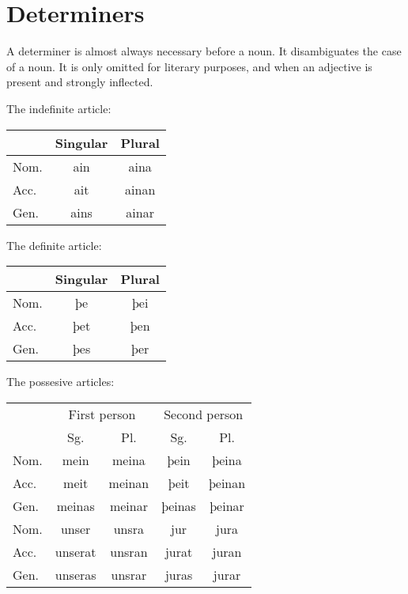 \section{Determiners}

A determiner is almost always necessary before a noun. It disambiguates the case of a noun. It is only omitted for literary purposes, and when an adjective is present and strongly inflected.

The indefinite article:

\begin{center}
\begin{tabular}{l|cc}
& Singular & Plural \\
\hline
Nom. & ain  & aina  \\
Acc. & ait  & ainan \\
Gen. & ains & ainar \\
\end{tabular}
\end{center}

The definite article:

\begin{center}
\begin{tabular}{l|cc}
& Singular & Plural \\
\hline
Nom. & þe  & þei \\
Acc. & þet & þen \\
Gen. & þes & þer \\
\end{tabular}
\end{center}

The possesive articles:

\begin{center}
\begin{tabular}{l|cccc}
& \multicolumn{2}{c}{First person} & \multicolumn{2}{c}{Second person} \\
& Sg. & Pl. & Sg. & Pl. \\
\hline
Nom. & mein   & meina  & þein   & þeina  \\
Acc. & meit   & meinan & þeit   & þeinan \\
Gen. & meinas & meinar & þeinas & þeinar \\
\hline
Nom. & unser   & unsra  & jur   & jura  \\
Acc. & unserat & unsran & jurat & juran \\
Gen. & unseras & unsrar & juras & jurar \\
\end{tabular}
\end{center}

